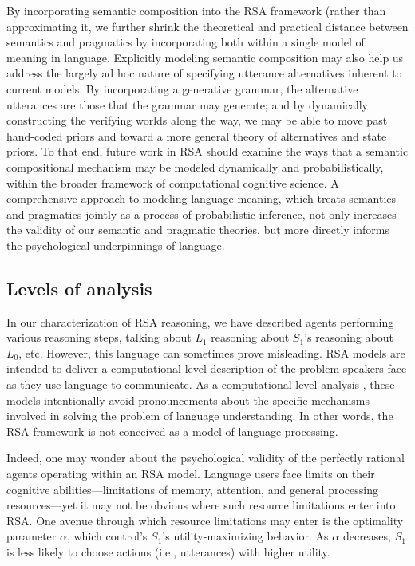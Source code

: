 \documentclass{sp}
\newcommand{\gcs}[1]{\textcolor{blue}{[gcs: #1]}}
\newcommand{\mf}[1]{\textcolor{orange}{[mf: #1]}}
\begin{document}
By incorporating semantic composition into the RSA framework (rather than approximating it, we further shrink the theoretical and practical distance between semantics and pragmatics by incorporating both within a single model of meaning in language. 
Explicitly modeling semantic composition may also help us address the largely ad hoc nature of specifying utterance alternatives inherent to current models. By incorporating a generative grammar, the alternative utterances are those that the grammar may generate; and by dynamically constructing the verifying worlds along the way, we may be able to move past hand-coded priors and toward a more general theory of alternatives and state priors. 
To that end, future work in RSA should examine the ways that a semantic compositional mechanism may be modeled dynamically and probabilistically, within the broader framework of computational cognitive science. A comprehensive approach to modeling language meaning, which treats semantics and pragmatics jointly as a process of probabilistic inference, not only increases the validity of our semantic and pragmatic theories, but more directly informs the psychological underpinnings of language.




\subsection{Levels of analysis}


In our characterization of RSA reasoning, we have described agents performing various reasoning steps, talking about $L_1$ reasoning about $S_1$'s reasoning about $L_0$, etc. However, this language can sometimes prove misleading. RSA models are intended to deliver a computational-level description of the problem speakers face as they use language to communicate. As a computational-level analysis \citep{marr1982}, these models intentionally avoid pronouncements about the specific mechanisms involved in solving the problem of language understanding. In other words, the RSA framework is not conceived as a model of language processing.

Indeed, one may wonder about the psychological validity of the perfectly rational agents operating within an RSA model. Language users face limits on their cognitive abilities---limitations of memory, attention, and general processing resources---yet it may not be obvious where such resource limitations enter into RSA. One avenue through which resource limitations may enter is the optimality parameter $\alpha$, which control's $S_1$'s utility-maximizing behavior. As $\alpha$ decreases, $S_1$ is less likely to choose actions (i.e., utterances) with higher utility.
\end{document}
